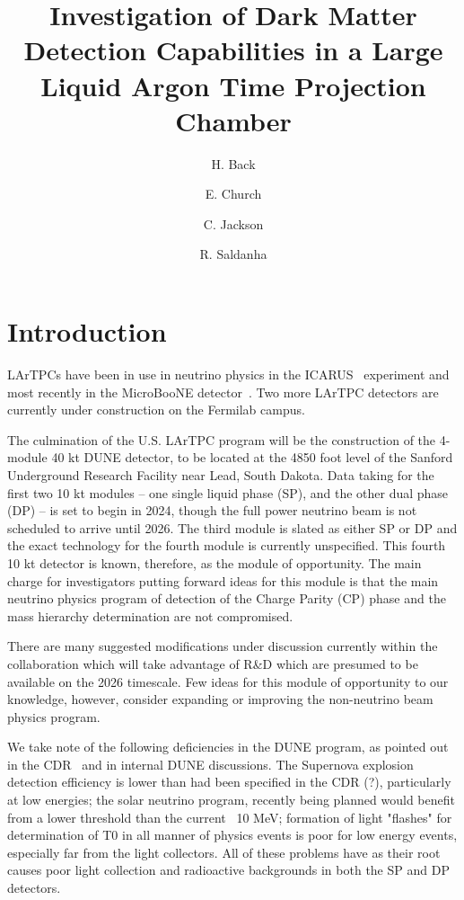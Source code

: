 \documentclass[a4paper,11pt]{article}
\title{Investigation of Dark Matter Detection Capabilities in a Large Liquid Argon Time Projection Chamber}
\author[a]{H. Back}
\author[a]{E. Church} %
\author[a]{C. Jackson}
\author[a]{R. Saldanha}
\affiliation[a]{Pacific Northwest National Laboratory, Richland, WA 99354}
\begin{document}
\maketitle
\flushbottom

\section{Introduction}
\label{sec:intro}

LArTPCs have been in use in neutrino physics in the ICARUS~\cite{ICARUS} experiment and most recently in the MicroBooNE detector~\cite{MicroB}. Two more LArTPC detectors are currently under construction on the Fermilab campus.

The culmination of the U.S. LArTPC program will be the construction of the 4-module 40 kt DUNE detector, to be located at the 4850 foot level of the Sanford Underground Research Facility near Lead, South Dakota. Data taking for the first two 10 kt modules -- one single liquid phase (SP), and the other dual phase (DP) -- is set to begin in 2024, though the full power neutrino beam is not scheduled to arrive until 2026. The third module is slated as either SP or DP and the exact technology for the fourth module is currently unspecified. This fourth 10 kt detector is known, therefore, as the module of opportunity. The main charge for investigators putting forward ideas for this module is that the main neutrino physics program of detection of the Charge Parity (CP) phase and the mass hierarchy determination are not compromised.

There are many suggested modifications under discussion currently within the collaboration which will take advantage of R\&D which are presumed to be available on the 2026 timescale. Few ideas for this module of opportunity to our knowledge, however, consider expanding or improving the non-neutrino beam physics program. 

We take note of the following  deficiencies in the DUNE program, as pointed out in the CDR~\cite{TDR} and in internal DUNE discussions. The Supernova explosion detection efficiency is lower than had been specified in the CDR (?), particularly at low energies; the solar neutrino program, recently being planned would benefit from a lower  threshold than the current ~10 MeV; formation of light "flashes" for determination of T0 in all manner of physics events is poor for low energy events, especially far from the light collectors. All of these problems have as their root causes  poor light collection and radioactive backgrounds in both the SP and DP detectors.
\end{document}

